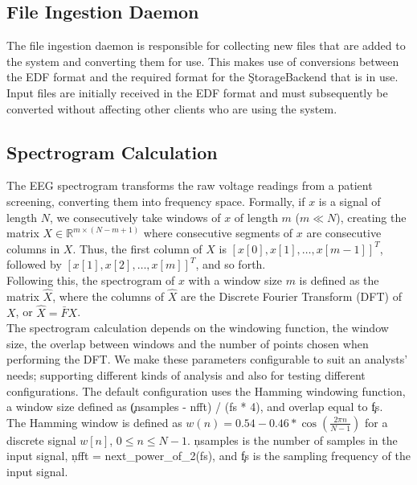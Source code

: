 \subsection{File Ingestion Daemon}

The file ingestion daemon is responsible for collecting new files that are
added to the system and converting them for use. This makes use of conversions
between the EDF format and the required format for the \c{StorageBackend} that
is in use. Input files are initially received in the EDF format and must
subsequently be converted without affecting other clients who are using the
system.

\subsection{Spectrogram Calculation}\label{compute-ch:design-spectrogram}

The EEG spectrogram transforms the raw voltage readings from a patient
screening, converting them into frequency space. Formally, if $x$ is a signal
of length $N$, we consecutively take windows of $x$ of length $m$ ($m \ll N$),
creating the matrix $X \in \mathbb{R}^{m \times (N - m + 1)}$ where consecutive
segments of $x$ are consecutive columns in $X$. Thus, the first column of $X$
is $[x[0], x[1], \ldots, x[m-1]]^T$, followed by $[x[1], x[2], \ldots,
x[m]]^T$, and so forth. \\

Following this, the spectrogram of $x$ with a window size $m$ is defined as the
matrix $\hat{X}$, where the columns of $\hat{X}$ are the Discrete Fourier
Transform (DFT) of $X$, or $\hat{X} = \bar{F}X$. \\

The spectrogram calculation depends on the windowing function, the window size,
the overlap between windows and the number of points chosen when performing the
DFT. We make these parameters configurable to suit an analysts' needs;
supporting different kinds of analysis and also for testing different
configurations. The default configuration uses the Hamming windowing function,
a window size defined as \c{(nsamples - nfft) / (fs * 4)}, and overlap equal to
\c{fs}. \\

The Hamming window is defined as $w(n) = 0.54 - 0.46*\cos(\frac{2 \pi n}{N
  -1})$ for a discrete signal $w[n]$, $0 \leq n \leq N -1$. \c{nsamples} is the
number of samples in the input signal, \c{nfft = next\_power\_of\_2(fs)},
and \c{fs} is the sampling frequency of the input signal.

